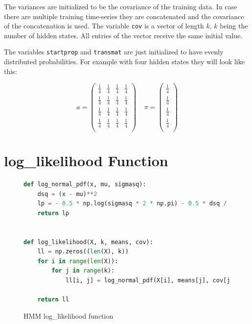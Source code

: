 The variances are initialized to be the covariance of the training data. In case there are multiple training time-series they are concatenated and the covariance of the concatenation is used. The variable \texttt{cov} is a vector of length $k$, $k$ being the number of hidden states. All entries of the vector receive the same initial value. 

The variables \texttt{startprop} and \texttt{transmat} are just initialized to have evenly distributed probabilities. For example with four hidden states they will look like this: 

\begin{equation}
a = 
\begin{pmatrix}
\frac{1}{4} & \frac{1}{4} & \frac{1}{4} & \frac{1}{4} \\
\frac{1}{4} & \frac{1}{4} & \frac{1}{4} & \frac{1}{4} \\
\frac{1}{4} & \frac{1}{4} & \frac{1}{4} & \frac{1}{4} \\
\frac{1}{4} & \frac{1}{4} & \frac{1}{4} & \frac{1}{4} \\
\end{pmatrix}
\;\;\;\;
\pi = 
\begin{pmatrix}
\frac{1}{4}  \\
\frac{1}{4}  \\
\frac{1}{4}  \\
\frac{1}{4}  \\
\end{pmatrix}
\end{equation}

\section{log\_likelihood Function}

\begin{figure}
\begin{singlespace}
\begin{lstlisting}[language=Python]
def log_normal_pdf(x, mu, sigmasq):
    dsq = (x - mu)**2
    lp = - 0.5 * np.log(sigmasq * 2 * np.pi) - 0.5 * dsq / sigmasq
    return lp


def log_likelihood(X, k, means, cov):
    ll = np.zeros((len(X), k))
    for i in range(len(X)):
        for j in range(k):
            ll[i, j] = log_normal_pdf(X[i], means[j], cov[j])

    return ll
\end{lstlisting}
\end{singlespace}
   
\caption{HMM log\_likelihood function}    
\label{fig:hmm-ll-listing}
\end{figure}

